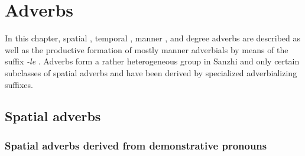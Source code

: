 \chapter{Adverbs}
\label{cpt:morph-adverbs}

In this chapter, spatial , temporal , manner , and degree adverbs  are described as well as the productive formation of mostly manner adverbials by means of the suffix \textit{-le} . Adverbs form a rather heterogeneous group in Sanzhi and only certain subclasses of spatial adverbs and  have been derived by specialized adverbializing suffixes.



\section{Spatial adverbs}
\label{sec:spatialadverb}



\subsection{Spatial adverbs derived from demonstrative pronouns}
\label{ssec:SpatialAdverbsDerivedFromDemonstrativePronouns}

